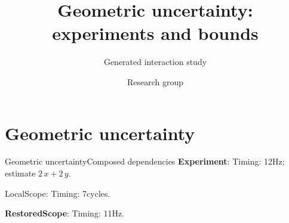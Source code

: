 \documentclass[12pt,aspectratio=43]{beamer}
\title{Geometric uncertainty: experiments and bounds}
\subtitle{Generated interaction study}
\author{Research group}
\date{}
\newcommand{\fuzzlayerA}[1]{\textbf{#1}}
\newcommand{\fuzzlayerB}[1]{\fuzzlayerA{#1}}
\newcommand{\fuzzlayerC}[1]{\fuzzlayerB{#1}}
\newcommand{\fuzzterm}[1]{\fuzzlayerC{#1}}
\newcommand{\fuzzpair}[2]{\fuzzterm{#1}: #2}
\newcommand{\fuzzunit}{Hz}
\newcommand{\fuzzcoefficient}{2}
\newcommand{\fuzzscale}[2][\fuzzcoefficient]{#1\,#2}
\begin{document}
\section{Geometric uncertainty}
\begin{frame}[t,shrink=5]{Geometric uncertainty}{Composed dependencies}
\fuzzpair{Experiment}{Timing: 12\fuzzunit; estimate $\fuzzscale{x}+\fuzzscale[2]{y}$.}\par
{\renewcommand{\fuzzunit}{cycles}\let\fuzzterm\textrm\fuzzpair{LocalScope}{Timing: 7\fuzzunit.}\par}
\fuzzpair{RestoredScope}{Timing: 11\fuzzunit.}\par
{}
\end{frame}
\end{document}
